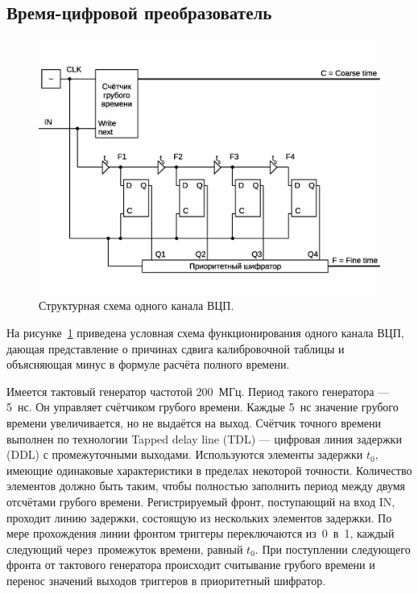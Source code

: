 \subsection{Время-цифровой преобразователь}\label{sec:secTDC}

\begin{figure}[H]
\includegraphics[width=1.0\textwidth]{pictures/TDC.eps}
\caption{Структурная схема одного канала ВЦП.}
\label{fig:TDCscheme}
\end{figure}

На рисунке~\ref{fig:TDCscheme} приведена условная схема функционирования одного канала ВЦП, дающая представление о причинах сдвига калибровочной таблицы и объясняющая минус в формуле расчёта полного времени.

Имеется тактовый генератор частотой 200~МГц. Период такого генератора --- 5~нс. Он управляет счётчиком грубого времени. Каждые 5~нс значение грубого времени увеличивается, но не выдаётся на выход. Счётчик точного времени выполнен по технологии Tapped delay line (TDL) --- цифровая линия задержки (DDL) с промежуточными выходами. Используются элементы задержки $ t_{0} $, имеющие одинаковые характеристики в пределах некоторой точности. Количество элементов должно быть таким, чтобы полностью заполнить период между двумя отсчётами грубого времени. Регистрируемый фронт, поступающий на вход IN, проходит линию задержки, состоящую из нескольких элементов задержки. По мере прохождения линии фронтом триггеры переключаются из~0~в~1, каждый следующий через промежуток времени, равный $ t_{0} $. При поступлении следующего фронта от тактового генератора происходит считывание грубого времени и перенос значений выходов триггеров в приоритетный шифратор.

